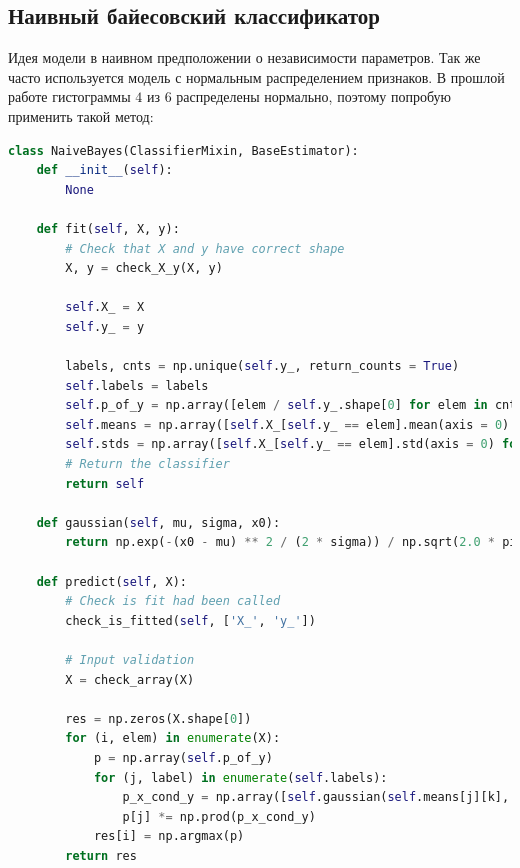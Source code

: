 \subsection{Наивный байесовский классификатор}
Идея модели в наивном предположении о независимости параметров. Так же часто используется модель с нормальным распределением признаков. 
В прошлой работе гистограммы $4$ из $6$ распределены нормально, поэтому попробую применить такой метод:
\begin{lstlisting}[language=Python]
class NaiveBayes(ClassifierMixin, BaseEstimator):
    def __init__(self):
        None

    def fit(self, X, y):
        # Check that X and y have correct shape
        X, y = check_X_y(X, y)

        self.X_ = X
        self.y_ = y

        labels, cnts = np.unique(self.y_, return_counts = True)
        self.labels = labels
        self.p_of_y = np.array([elem / self.y_.shape[0] for elem in cnts])
        self.means = np.array([self.X_[self.y_ == elem].mean(axis = 0) for elem in labels])
        self.stds = np.array([self.X_[self.y_ == elem].std(axis = 0) for elem in labels])
        # Return the classifier
        return self

    def gaussian(self, mu, sigma, x0):
        return np.exp(-(x0 - mu) ** 2 / (2 * sigma)) / np.sqrt(2.0 * pi * sigma)

    def predict(self, X):
        # Check is fit had been called
        check_is_fitted(self, ['X_', 'y_'])

        # Input validation
        X = check_array(X)

        res = np.zeros(X.shape[0])
        for (i, elem) in enumerate(X):
            p = np.array(self.p_of_y)
            for (j, label) in enumerate(self.labels):
                p_x_cond_y = np.array([self.gaussian(self.means[j][k], self.stds[j][k], elem[k]) for k in range(X.shape[1])])
                p[j] *= np.prod(p_x_cond_y)
            res[i] = np.argmax(p)
        return res
\end{lstlisting}
\pagebreak

